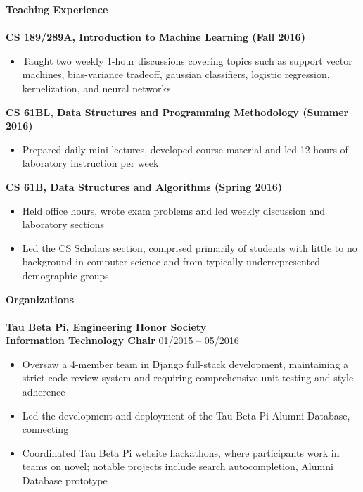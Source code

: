 \documentclass{article}
\begin{document}
\noindent
\textbf{{\Large Teaching Experience}}\\[-2mm]
\HRule\\
\textbf{CS 189/289A, Introduction to Machine Learning (Fall 2016)}
\begin{itemize}
\vspace{-1.8mm}
\item Taught two weekly 1-hour discussions covering topics such as support vector machines, bias-variance tradeoff, gaussian classifiers, logistic regression, kernelization, and neural networks
\end{itemize}
\textbf{CS 61BL, Data Structures and Programming Methodology (Summer 2016)}
\begin{itemize}
\vspace{-1.8mm}
\item Prepared daily mini-lectures, developed course material and led 12 hours of laboratory instruction per week
\end{itemize}
\textbf{CS 61B, Data Structures and Algorithms (Spring 2016)}
\begin{itemize}
\vspace{-1.8mm}
\item Held office hours, wrote exam problems and led weekly discussion and laboratory sections
\vspace{-2.5mm}
\item Led the CS Scholars section, comprised primarily of students with little to no background in computer science and from typically underrepresented demographic groups
\end{itemize}
\newpage

\noindent
\textbf{{\Large Organizations}}\\[-2mm]
\HRule\\
\textbf{Tau Beta Pi, Engineering Honor Society} \\
\textbf{Information Technology Chair}
\hfill 01/2015 -- 05/2016
\begin{itemize}
\vspace{-1.8mm}
\item Oversaw a 4-member team in Django full-stack development, maintaining a strict code review system and requiring comprehensive unit-testing and style adherence
\vspace{-2.5mm}
\item Led the development and deployment of the Tau Beta Pi Alumni Database, connecting 
\item Coordinated Tau Beta Pi website hackathons, where participants work in teams on novel; notable projects include search autocompletion, Alumni Database prototype
\end{itemize}
\end{document}
